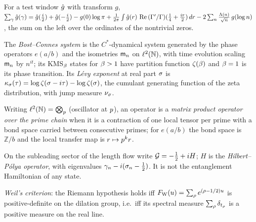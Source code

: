 \begin{definition}
\label{def:explicit-formula}
For a test window $\hat g$ with transform $g$,
$\sum_{\gamma}\hat g(\gamma) = \hat g(\tfrac i2)+\hat g(-\tfrac i2) - g(0)\log\pi
+ \frac1{2\pi}\int\hat g(r)\,\operatorname{Re}\,(\Gamma'/\Gamma)(\tfrac14+\tfrac{ir}2)\,dr
- 2\sum_n\frac{\Lambda(n)}{\sqrt n}\,g(\log n)$, the sum on the left over the
ordinates of the nontrivial zeros.
\end{definition}

\begin{definition}
\label{def:bost-connes}
The \emph{Bost--Connes system} is the $C^*$-dynamical system generated by the
phase operators $e(a/b)$ and the isometries $\mathsf m_{n}$ on $\ell^2(\mathbb N)$,
with time evolution scaling $\mathsf m_{n}$ by $n^{it}$; its KMS$_\beta$ states for
$\beta>1$ have partition function $\zeta(\beta)$ and $\beta = 1$ is its
phase transition. Its \emph{Lévy exponent} at real part $\sigma$ is
$\kappa_{\sigma}(\tau) = \log\zeta(\sigma-i\tau) - \log\zeta(\sigma)$, the
cumulant generating function of the zeta distribution, with jump measure
$\nu_{\sigma}$.
\end{definition}

\begin{definition}
\label{def:prime-chain-mpo}
Writing $\ell^2(\mathbb N) = \bigotimes_{p}$ (oscillator at $p$), an
operator is a \emph{matrix product operator over the prime chain} when it
is a contraction of one local tensor per prime with a bond space carried
between consecutive primes; for $e(a/b)$ the bond space is $\mathbb Z/b$ and
the local transfer map is $r\mapsto p^k r$.
\end{definition}

\begin{definition}
\label{def:hilbert-polya}
On the subleading sector of the length flow write $\mathcal G = -\tfrac12 +
iH$; $H$ is the \emph{Hilbert--P\'olya operator}, with eigenvalues $\gamma_n
- i(\sigma_n-\tfrac12)$. It is not the entanglement Hamiltonian of any state.
\end{definition}

\begin{definition}
\label{def:weil-positivity}
\emph{Weil's criterion}: the Riemann hypothesis holds iff
$F_{\mathrm W}(u) = \sum_{\rho}e^{(\rho-1/2)u}$ is positive-definite on the
dilation group, i.e.\ iff its spectral measure $\sum_{\rho}\delta_{t_{\rho}}$
is a positive measure on the real line.
\end{definition}

